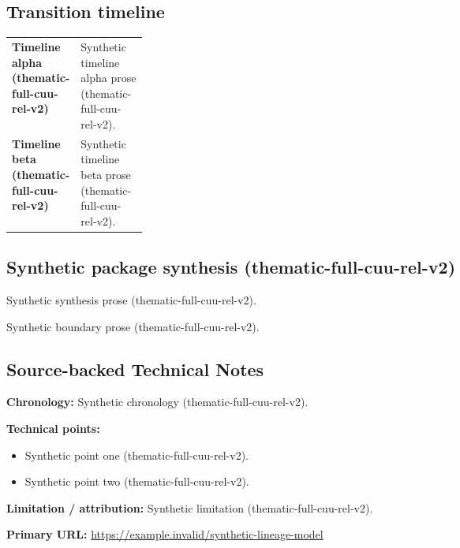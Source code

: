 \documentclass[lualatex,a4paper,10pt]{jlreq}
\begin{document}
\medskip
\begin{wideflow}
\subsection*{Transition timeline}
\begin{tabularx}{\linewidth}{@{}>{\bfseries}p{0.20\linewidth}X@{}}
Timeline alpha (thematic-full-cuu-rel-v2) & Synthetic timeline alpha prose (thematic-full-cuu-rel-v2). \cite{sp001lnd001} \\
Timeline beta (thematic-full-cuu-rel-v2) & Synthetic timeline beta prose (thematic-full-cuu-rel-v2). \cite{sp001lnd001} \\
\end{tabularx}
\end{wideflow}
\medskip
\begin{multicols}{2}
\subsection*{Synthetic package synthesis (thematic-full-cuu-rel-v2)}
\noindent Synthetic synthesis prose (thematic-full-cuu-rel-v2). \cite{sp001lnd001}\par\medskip
\end{multicols}
\medskip
\begin{claimboundary}
\noindent Synthetic boundary prose (thematic-full-cuu-rel-v2). \cite{sp001lnd001}\par
\end{claimboundary}
\medskip
\subsection*{Source-backed Technical Notes}
\begin{technicalnote}
\noindent\textbf{Chronology:} Synthetic chronology (thematic-full-cuu-rel-v2). \cite{sp001lnd001}\par
\smallskip\noindent\textbf{Technical points:}\par
\begin{itemize}
\item Synthetic point one (thematic-full-cuu-rel-v2). \cite{sp001lnd001}
\item Synthetic point two (thematic-full-cuu-rel-v2). \cite{sp001lnd001}
\end{itemize}
\noindent\textbf{Limitation / attribution:} Synthetic limitation (thematic-full-cuu-rel-v2).\par
\smallskip\noindent\textbf{Primary URL:} \url{https://example.invalid/synthetic-lineage-model}\par
\end{technicalnote}
\smallskip
\Needspace{0.30\textheight}
\end{document}
